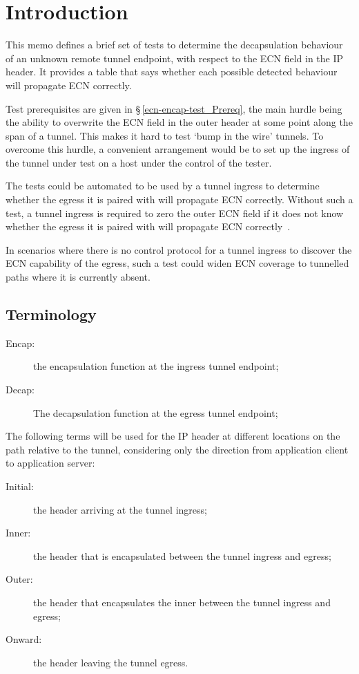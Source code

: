 \section{Introduction}\label{ecn-encap-test_Intr}

This memo defines a brief set of tests to determine the decapsulation behaviour
of an unknown remote tunnel endpoint, with respect to the ECN field in the IP
header. It provides a table that says whether each possible detected behaviour
will propagate ECN correctly.

Test prerequisites are given in \S\,\ref{ecn-encap-test_Prereq}, the main hurdle
being the ability to overwrite the ECN field in the outer header at some point
along the span of a tunnel. This makes it hard to test `bump in the wire'
tunnels. To overcome this hurdle, a convenient arrangement would be to set up
the ingress of the tunnel under test on a host under the control of the tester.

The tests could be automated to be used by a tunnel ingress to determine whether
the egress it is paired with will propagate ECN correctly. Without such a test,
a tunnel ingress is required to zero the outer ECN field if it does not know
whether the egress it is paired with will propagate ECN
correctly~\cite{Briscoe16b:ecn-tunnel-scope_ID}.

In scenarios where there is no control protocol for a tunnel ingress to discover
the ECN capability of the egress, such a test could widen ECN coverage to
tunnelled paths where it is currently absent.

\subsection{Terminology}\label{ecn-encap-test_Term}

\begin{description}
	\item[Encap:] the encapsulation function at the ingress tunnel endpoint;
	\item[Decap:] The decapsulation function at the egress tunnel endpoint;
\end{description}

The following terms will be used for the IP header at different locations on the path relative to the tunnel, considering only the direction from application client to application server:
\begin{description}
	\item[Initial:] the header arriving at the tunnel ingress;
	\item[Inner:] the header that is encapsulated between the tunnel ingress and egress;
	\item[Outer:] the header that encapsulates the inner between the tunnel ingress and egress;
	\item[Onward:] the header leaving the tunnel egress.
\end{description}
